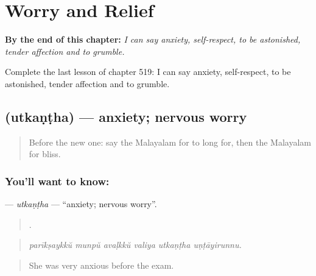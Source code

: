 
\chapter{Worry and Relief}
\label{ch:ml-worry-and-relief}

\begin{chapteropening}
\textbf{By the end of this chapter:} \emph{I can say anxiety, self-respect, to be astonished, tender affection and to grumble.}

Complete the last lesson of chapter 519: I can say anxiety, self-respect, to be astonished, tender affection and to grumble.
\end{chapteropening}

\section[\texorpdfstring{\ml{ഉത്കണ്ഠ} (utkaṇṭha)}{ഉത്കണ്ഠ (utkaṇṭha)}]{ (utkaṇṭha) — anxiety; nervous worry}

\label{lesson:ML-C519-utkantha}



\begin{quote}
Before the new one: say the Malayalam for to long for, then the Malayalam for bliss.
\end{quote}

\subsection*{You'll want to know: }
\textbf{} — \emph{utkaṇṭha} — \textquotedblleft{}anxiety; nervous worry\textquotedblright{}.

\begin{quote}
     .
\end{quote}

\begin{quote}
\emph{parīkṣaykkŭ munpŭ avaḷkkŭ valiya utkaṇṭha uṇṭāyirunnu.}
\end{quote}

\begin{quote}
She was very anxious before the exam.
\end{quote}

